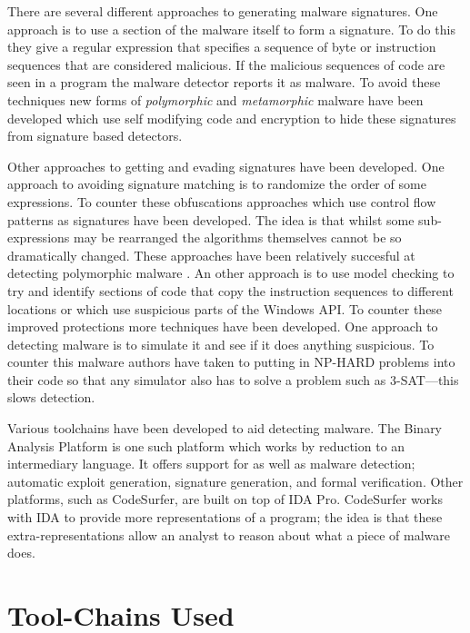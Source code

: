 \documentclass[]{book}
\begin{document}
There are several different approaches to generating malware signatures.
One approach is to use a section of the malware itself to form a
signature. To do this they give a regular expression that specifies a
sequence of byte or instruction sequences that are considered malicious.
If the malicious sequences of code are seen in a program the malware
detector reports it as malware. To avoid these techniques new forms of
\emph{polymorphic} and \emph{metamorphic} malware have been developed
which use self modifying code and encryption to hide these signatures
from signature based detectors\autocite{Christodorescu:2005vf}.

Other approaches to getting and evading signatures have been developed.
One approach to avoiding signature matching is to randomize the order of
some
expressions\autocite{Borello:2008vx}\autocite{Christodorescu:2005vf}. To
counter these obfuscations approaches which use control flow patterns as
signatures have been developed\autocite{Bonfante:2007th}. The idea is
that whilst some sub-expressions may be rearranged the algorithms
themselves cannot be so dramatically changed. These approaches have been
relatively succesful at detecting polymorphic malware
\autocite{Kang:2011bs}\autocite{Bruschi:vb}. An other approach is to use
model checking to try and identify sections of code that copy the
instruction sequences to different locations or which use suspicious
parts of the Windows API\autocite{Kinder:2005hu}. To counter these
improved protections more techniques have been developed. One approach
to detecting malware is to simulate it and see if it does anything
suspicious. To counter this malware authors have taken to putting in
NP-HARD problems into their code so that any simulator also has to solve
a problem such as 3-SAT\autocite{Moser:2007cd}---this slows detection.

Various toolchains have been developed to aid detecting malware. The
Binary Analysis Platform\autocite{Brumley:wn} is one such platform which
works by reduction to an intermediary language. It offers support for as
well as malware detection; automatic exploit
generation\autocite{Avgerinos:vo}, signature generation, and formal
verification. Other platforms, such as
CodeSurfer\autocite{Balakrishnan:2005tx}, are built on top of IDA
Pro\autocite{HexRays:up}. CodeSurfer works with IDA to provide more
representations of a program; the idea is that these
extra-representations allow an analyst to reason about what a piece of
malware does.

\section{Tool-Chains Used}
\end{document}
